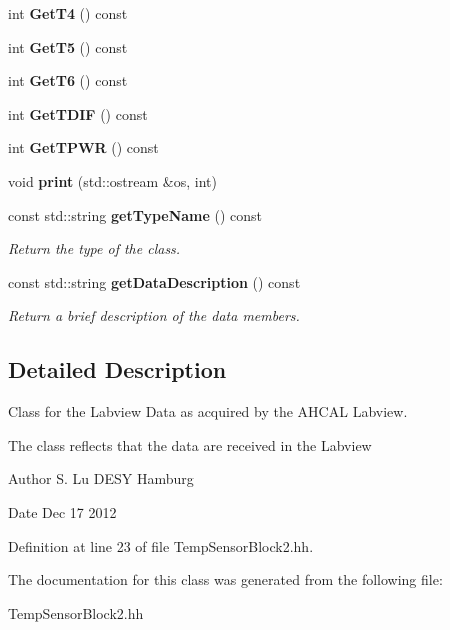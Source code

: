 \begin{DoxyCompactItemize}
\item 
int {\bfseries Get\-T4} () const \label{classCALICE_1_1TempSensorBlock2_a8689abf3279957fe644cf450ee08ddc8}

\item 
int {\bfseries Get\-T5} () const \label{classCALICE_1_1TempSensorBlock2_a9f6702c33d6e3813b1d2b24b918d8d82}

\item 
int {\bfseries Get\-T6} () const \label{classCALICE_1_1TempSensorBlock2_a54d82a9b7521b8d9483ee600c1ad375f}

\item 
int {\bfseries Get\-T\-D\-I\-F} () const \label{classCALICE_1_1TempSensorBlock2_a833e1b88513124ae5370c2777dfa0bdd}

\item 
int {\bfseries Get\-T\-P\-W\-R} () const \label{classCALICE_1_1TempSensorBlock2_a9120824274d48a1a77218219de1139da}

\item 
void {\bfseries print} (std\-::ostream \&os, int)\label{classCALICE_1_1TempSensorBlock2_a18fcad9b01f87d568216df1198423cff}

\item 
const std\-::string {\bf get\-Type\-Name} () const \label{classCALICE_1_1TempSensorBlock2_aa7c390c29411439dbd83bd24f639570d}

\begin{DoxyCompactList}\small\item\em Return the type of the class. \end{DoxyCompactList}\item 
const std\-::string {\bf get\-Data\-Description} () const \label{classCALICE_1_1TempSensorBlock2_a876ddbe948463b85208e29cc03fc894b}

\begin{DoxyCompactList}\small\item\em Return a brief description of the data members. \end{DoxyCompactList}\end{DoxyCompactItemize}


\subsection{Detailed Description}
Class for the Labview Data as acquired by the A\-H\-C\-A\-L Labview. 

The class reflects that the data are received in the Labview \begin{DoxyAuthor}{Author}
S. Lu D\-E\-S\-Y Hamburg 
\end{DoxyAuthor}
\begin{DoxyDate}{Date}
Dec 17 2012 
\end{DoxyDate}


Definition at line 23 of file Temp\-Sensor\-Block2.\-hh.



The documentation for this class was generated from the following file\-:\begin{DoxyCompactItemize}
\item 
Temp\-Sensor\-Block2.\-hh\end{DoxyCompactItemize}
